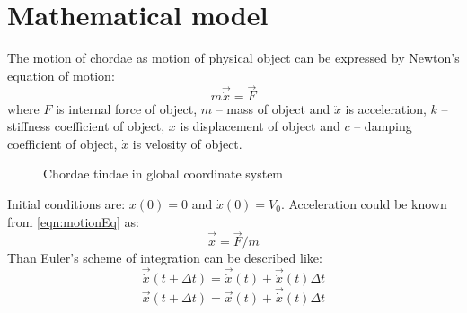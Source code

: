 \section*{Mathematical model}
The motion of chordae as motion of physical object can be expressed by Newton's
equation of motion:
\begin{equation}\label{eqn:motionEq}
  m\vec{\ddot{x}}= \vec{F}
\end{equation}
where $F$ is internal force of object, $m$ – mass of object and $\ddot{x}$ is
acceleration, $k$ – stiffness coefficient of object, $x$ is displacement of
object and $c$ – damping coefficient of object, $\dot{x}$ is velosity of object.
\begin{figure}[H]\label{fig:chordaeInCoords}
  \centering
  
  \caption{Chordae tindae in global coordinate system}
\end{figure}
Initial conditions are: $x(0)=0$ and $\dot{x}(0)=V_0$.
Acceleration could be known from \eqref{eqn:motionEq} as:
\begin{equation}\label{eqn:Accel}
  \vec{\ddot{x}}=\vec{F}/m
\end{equation}
Than Euler's scheme of integration can be described like:
\begin{equation}\label{eqn:Velos}
  \vec{\dot{x}}(t +\Delta t)=\vec{\dot{x}}(t)+\vec{\ddot{x}}(t)\Delta t
\end{equation}
\begin{equation}\label{eqn:Displ}
  \vec{x}(t +\Delta t)=\vec{x}(t)+\vec{\dot{x}}(t)\Delta t
\end{equation}\par
